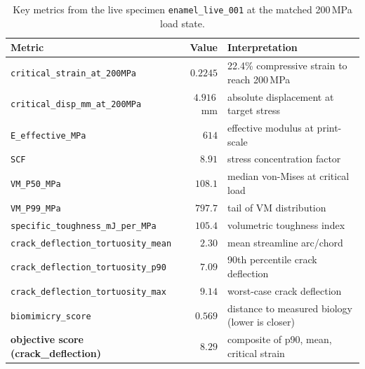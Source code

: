\documentclass[11pt, letterpaper]{article}
\begin{document}
\begin{table}[h!]
\centering
\caption{Key metrics from the live specimen \texttt{enamel\_live\_001} at the matched 200\,MPa load state.}
\label{tab:livemetrics}
\small
\renewcommand{\arraystretch}{1.3}
\begin{tabular}{l r l}
\toprule
\textbf{Metric} & \textbf{Value} & \textbf{Interpretation} \\
\midrule
\texttt{critical\_strain\_at\_200MPa}         & $0.2245$    & 22.4\% compressive strain to reach 200\,MPa \\
\texttt{critical\_disp\_mm\_at\_200MPa}       & $4.916$\,mm & absolute displacement at target stress \\
\texttt{E\_effective\_MPa}                    & $614$       & effective modulus at print-scale \\
\texttt{SCF}                                  & $8.91$      & stress concentration factor \\
\texttt{VM\_P50\_MPa}                         & $108.1$     & median von-Mises at critical load \\
\texttt{VM\_P99\_MPa}                         & $797.7$     & tail of VM distribution \\
\texttt{specific\_toughness\_mJ\_per\_MPa}    & $105.4$     & volumetric toughness index \\
\texttt{crack\_deflection\_tortuosity\_mean}  & $2.30$      & mean streamline arc/chord \\
\texttt{crack\_deflection\_tortuosity\_p90}   & $7.09$      & 90th percentile crack deflection \\
\texttt{crack\_deflection\_tortuosity\_max}   & $9.14$      & worst-case crack deflection \\
\texttt{biomimicry\_score}                    & $0.569$     & distance to measured biology (lower is closer) \\
\textbf{objective score (crack\_deflection)}  & $\mathbf{8.29}$ & composite of p90, mean, critical strain \\
\bottomrule
\end{tabular}
\end{table}
\end{document}
